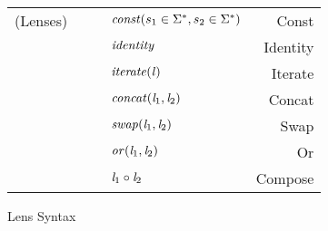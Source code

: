 \begin{figure}
\centering
\begin{tabular}{l@{\ }l@{\ }c@{\ }l@{\ }r}
(Lenses)& \Lens{} & \GEq{} & $\mathit{const}(s_1 \in \Sigma^*,s_2 \in \Sigma^*)$ & Const \\
& & & \GBar{} $\mathit{identity}$ & Identity\\
& & & \GBar{} $\mathit{iterate(\mathit{l})}$ & Iterate \\
& & & \GBar{} $\mathit{concat}(\mathit{l}_1,\mathit{l}_2)$ & Concat \\
& & & \GBar{} $\mathit{swap}(\mathit{l}_1,\mathit{l}_2)$ & Swap\\
& & & \GBar{} $\mathit{or}(\mathit{l}_1,\mathit{l}_2)$ & Or\\
& & & \GBar{} $\mathit{l}_1 \circ \mathit{l}_2$ & Compose\\
\end{tabular}
\caption{Lens Syntax}
\label{fig:lens-syntax}
\end{figure}
